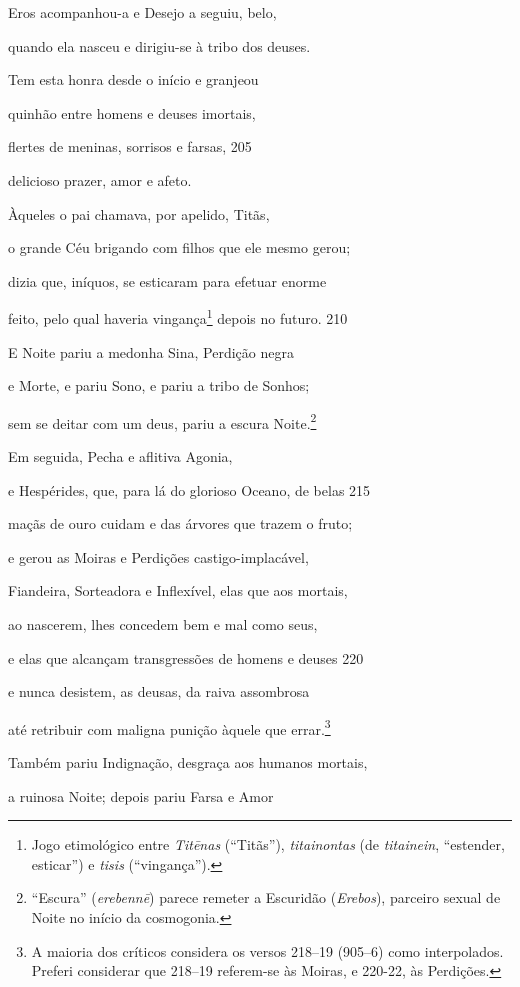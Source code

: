 Eros acompanhou-a e Desejo a seguiu, belo,

quando ela nasceu e dirigiu-se à tribo dos deuses.

Tem esta honra desde o início e granjeou

quinhão entre homens e deuses imortais,

flertes de meninas, sorrisos e farsas, \num{205}

delicioso prazer, amor e afeto.

\quad{}Àqueles o pai chamava, por apelido, Titãs,

o grande Céu brigando com filhos que ele mesmo gerou;

dizia que, iníquos, se esticaram para efetuar enorme

feito, pelo qual haveria vingança\footnote{Jogo etimológico entre \emph{Titēnas} (``Titãs''),
\emph{titainontas} (de \emph{titainein}, ``estender, esticar'') e
\emph{tisis} (``vingança'').} depois no futuro. \num{210}

\quad{}E Noite pariu a medonha Sina, Perdição negra

e Morte, e pariu Sono, e pariu a tribo de Sonhos;

sem se deitar com um deus, pariu a escura Noite.\footnote{``Escura'' (\emph{erebennē}) parece remeter a Escuridão (\emph{Erebos}), parceiro sexual de Noite no início da cosmogonia.}

Em seguida, Pecha e aflitiva Agonia,

e Hespérides, que, para lá do glorioso Oceano, de belas \num{215}

maçãs de ouro cuidam e das árvores que trazem o fruto;

e gerou as Moiras e Perdições castigo-implacável,

Fiandeira, Sorteadora e Inflexível, elas que aos mortais,

ao nascerem, lhes concedem bem e mal como seus,

e elas que alcançam transgressões de homens e deuses \num{220}

e nunca desistem, as deusas, da raiva assombrosa

até retribuir com maligna punição àquele que errar.\footnote{A maioria dos críticos considera os versos 218--19
(905--6) como interpolados. Preferi considerar que
218--19 referem-se às Moiras, e 220-22, às Perdições.}

Também pariu Indignação, desgraça aos humanos mortais,

a ruinosa Noite; depois pariu Farsa e Amor

